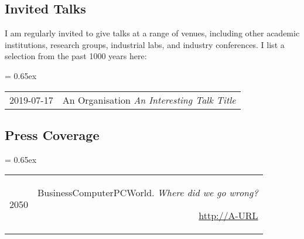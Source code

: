 \subsection{Invited Talks}

I am regularly invited to give talks at a range of venues, including other academic institutions, research groups, industrial labs, and industry conferences. I list a selection from the past 1000 years here:

{
  \tabulinesep = 0.65ex
  \begin{longtabu} to 

    2019-07-17 & An Organisation
    \it An Interesting Talk Title\\

  \end{longtabu}
}

\subsection{Press Coverage}

{
  \tabulinesep = 0.65ex
  \begin{longtabu} to 

    2050 & BusinessComputerPCWorld.
    {\it Where did we go wrong?}
    \par\url{http://A-URL}\\

  \end{longtabu}
}


